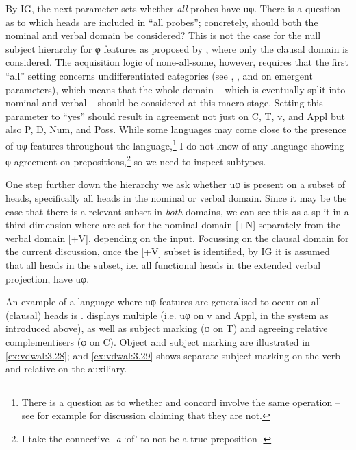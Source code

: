 \documentclass[output=paper]{langsci/langscibook}
\begin{document}
By \gls{IG}, the next parameter sets whether \emph{all} probes have uφ. There
is a question as to which heads are included in \enquote{all probes}; concretely,
should both the nominal and verbal domain be considered? This is not the case
for the null subject hierarchy for φ features as proposed by
\citet{RobHol2010}, where only the clausal domain is considered. The
acquisition logic of none-all-some, however, requires that the first
\enquote{all}
setting concerns undifferentiated categories (see
\citealt{Biberauer2011,Biberauer2018}, \citealt{Bazalgette2015}, and
\citealt{BibRob2017} on emergent parameters), which means that the
whole domain – which is eventually split into nominal and verbal – should be
considered at this macro stage. Setting this parameter to \enquote{yes} should result in
agreement not just on C, T, v, and Appl but also P, D, Num, and Poss. While
some  languages may come close to the presence of uφ features throughout
the language,\footnote{There is a question as to whether  and concord
involve the same operation – see for example \citet{Giusti2008} for discussion
claiming that they are not.} I do not know of any  language showing φ
agreement on prepositions,\footnote{I take the  connective \emph{-a} ‘of’
to not be a true preposition \parencite{vandeVelde2013}.} so we need to inspect
subtypes.

One step further down the hierarchy we ask whether uφ is present on a subset of
heads, specifically all heads in the nominal or verbal domain. Since it may be
the case that there is a relevant subset in \emph{both} domains, we can see
this as a split in a third dimension where  are set for the nominal
domain [+N] separately from the verbal domain [+V], depending on the input.
Focussing on the clausal domain for the current discussion, once the [+V]
subset is identified, by \gls{IG} it is assumed that all heads in the subset, i.e.
all functional heads in the extended verbal projection, have uφ.

An example of a language where uφ features are generalised to occur on all
(clausal) heads is .  displays multiple  (i.e. uφ on
v and Appl, in the system as introduced above), as well as subject marking (φ
on T) and agreeing relative complementisers (φ on C). Object and
subject marking are illustrated in \eqref{ex:vdwal:3.28}; and \eqref{ex:vdwal:3.29} shows
separate subject marking on the verb and relative  on the
auxiliary.
\end{document}
